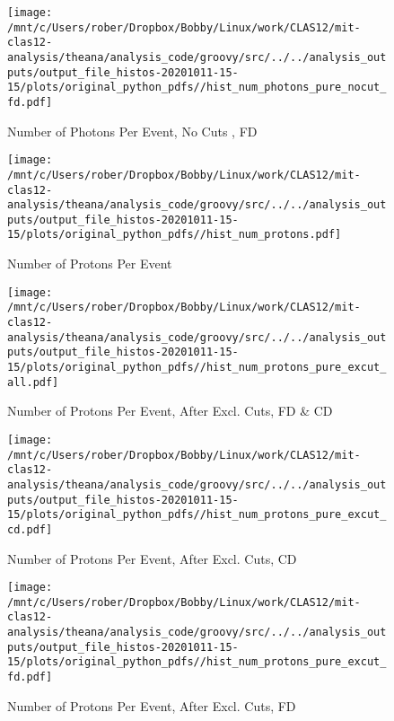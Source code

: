 \documentclass{article}
\begin{document}
\begin{landscape}
\begin{figure}[h]
        \texttt{[image: /mnt/c/Users/rober/Dropbox/Bobby/Linux/work/CLAS12/mit-clas12-analysis/theana/analysis\_code/groovy/src/../../analysis\_outputs/output\_file\_histos-20201011-15-15/plots/original\_python\_pdfs//hist\_num\_photons\_pure\_nocut\_fd.pdf]}
        \captionsetup{textformat=empty,labelformat=blank}
        \caption{Number of Photons Per Event, No Cuts , FD}
    \end{figure}
    \clearpage
    
    \begin{figure}[h]
        \centering

        \texttt{[image: /mnt/c/Users/rober/Dropbox/Bobby/Linux/work/CLAS12/mit-clas12-analysis/theana/analysis\_code/groovy/src/../../analysis\_outputs/output\_file\_histos-20201011-15-15/plots/original\_python\_pdfs//hist\_num\_protons.pdf]}
        \captionsetup{textformat=empty,labelformat=blank}
        \caption{Number of Protons Per Event}
    \end{figure}
    \clearpage
    
    \begin{figure}[h]
        \centering

        \texttt{[image: /mnt/c/Users/rober/Dropbox/Bobby/Linux/work/CLAS12/mit-clas12-analysis/theana/analysis\_code/groovy/src/../../analysis\_outputs/output\_file\_histos-20201011-15-15/plots/original\_python\_pdfs//hist\_num\_protons\_pure\_excut\_all.pdf]}
        \captionsetup{textformat=empty,labelformat=blank}
        \caption{Number of Protons Per Event, After Excl. Cuts, FD \& CD}
    \end{figure}
    \clearpage
    
    \begin{figure}[h]
        \centering

        \texttt{[image: /mnt/c/Users/rober/Dropbox/Bobby/Linux/work/CLAS12/mit-clas12-analysis/theana/analysis\_code/groovy/src/../../analysis\_outputs/output\_file\_histos-20201011-15-15/plots/original\_python\_pdfs//hist\_num\_protons\_pure\_excut\_cd.pdf]}
        \captionsetup{textformat=empty,labelformat=blank}
        \caption{Number of Protons Per Event, After Excl. Cuts, CD}
    \end{figure}
    \clearpage
    
    \begin{figure}[h]
        \centering

        \texttt{[image: /mnt/c/Users/rober/Dropbox/Bobby/Linux/work/CLAS12/mit-clas12-analysis/theana/analysis\_code/groovy/src/../../analysis\_outputs/output\_file\_histos-20201011-15-15/plots/original\_python\_pdfs//hist\_num\_protons\_pure\_excut\_fd.pdf]}
        \captionsetup{textformat=empty,labelformat=blank}
        \caption{Number of Protons Per Event, After Excl. Cuts, FD}
    \end{figure}
    \clearpage
    

\end{landscape}
\end{document}
